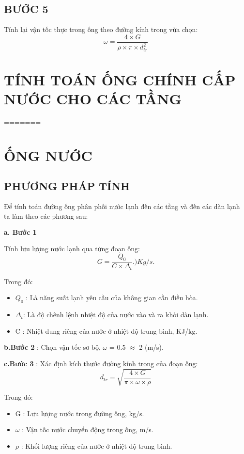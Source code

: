 \subsection{BƯỚC 5}
Tính lại vận tốc thực trong ống theo đường kính trong vừa chọn:
\begin{equation*}
	\omega = \dfrac{4\times G}{\rho\times\pi\times d_{tr}^2}
\end{equation*}

\section{TÍNH TOÁN ỐNG CHÍNH CẤP NƯỚC CHO CÁC TẦNG}
=======
\section{ỐNG NƯỚC}
\subsection{PHƯƠNG PHÁP TÍNH}
Để tính toán đường ống phân phối nước lạnh đến các tầng và đến các dàn lạnh ta làm theo các phương sau:

\textbf{a. Bước 1}

Tính lưu lượng nước lạnh qua từng đoạn ống:
\begin{equation*}
	G = \dfrac{Q_{0}}{C \times \Delta_{t}}. )Kg/s.
\end{equation*}

Trong đó:
\begin{itemize}
	\item $Q_{0}$ : Là năng suất lạnh yêu cầu của không gian cần điều hòa.
	\item $\Delta_{t}$: Là độ chênh lệnh nhiệt độ của nước vào và ra khỏi dàn lạnh.
	\item C : Nhiệt dung riêng của nước ở nhiệt độ trung bình, KJ/kg.
\end{itemize}

\textbf{b.Bước 2} : Chọn vận tốc sơ bộ, $\omega$ = 0.5 $\approx$ 2 (m/s).

\textbf{c.Bước 3} : Xác định kích thước đường kính trong của đoạn ống:
\begin{equation*}
	d_{tr} = \sqrt{\dfrac{4 \times G}{\pi \times \omega \times \rho }}
\end{equation*}

Trong đó:
\begin{itemize}
	\item G : Lưu lượng nước trong đường ống, kg/s.
	\item $\omega$ : Vận tốc nước chuyển động trong ống, m/s.
	\item $\rho$ : Khối lượng riêng của nước ở nhiệt độ trung bình.
\end{itemize}

